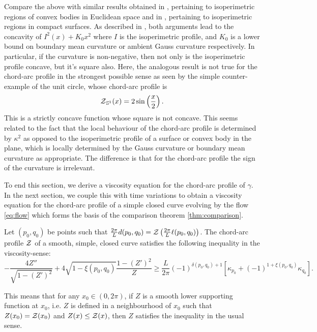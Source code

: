 \documentclass[a4paper, 12pt]{amsart}
\begin{document}
\begin{rem}
Compare the above with similar results obtained in \cite{MR1674097}, pertaining to isoperimetric regions of convex bodies in Euclidean space and in \cite{MR875084}, pertaining to isoperimetric regions in compact surfaces. As described in \cite{pbthesis}, both arguments lead to the concavity of $I^2(x) + K_0 x^2$ where $I$ is the isoperimetric profile, and $K_0$ is a lower bound on boundary mean curvature or ambient Gauss curvature respectively. In particular, if the curvature is non-negative, then not only is the isoperimetric profile concave, but it's square also. Here, the analogous result is not true for the chord-arc profile in the strongest possible sense as seen by the simple counter-example of the unit circle, whose chord-arc profile is 
\[
\operatorname{\mathcal{Z}}_{\mathbb{S}^1} (x) = 2 \sin \left(\frac{x}{2}\right).
\]
This is a strictly concave function whose square is not concave. This seems related to the fact that the local behaviour of the chord-arc profile is determined by $\kappa^2$ as opposed to the isoperimetric profile of a surface or convex body in the plane, which is locally determined by the Gauss curvature or boundary mean curvature as appropriate. The difference is that for the chord-arc profile the sign of the curvature is irrelevant.
\end{rem}

To end this section, we derive a viscosity equation for the chord-arc profile of $\gamma$. In the next section, we couple this with time variations to obtain a viscosity equation for the chord-arc profile of a simple closed curve evolving by the flow \ref{eq:flow} which forms the basis of the comparison theorem \ref{thm:comparison}. 

\begin{thm}
\label{thm:spatial_viscosity}
Let $(p_0,q_0)$ be points such that $\tfrac{2\pi}{L} d(p_0, q_0) = \operatorname{\mathcal{Z}}\left(\frac{2\pi}{L}\ell(p_0, q_0)\right)$. The chord-arc profile $\operatorname{\mathcal{Z}}$ of a smooth, simple, closed curve satisfies the following inequality in the viscosity-sense:
\[
-\frac{4Z''}{\sqrt{1 - (Z')^2}} + 4\sqrt{1-\xi(p_0,q_0)} \frac{1 - (Z')^2}{Z} \geq \frac{L}{2\pi} (-1)^{\delta(p_0,q_0)+1} \left[\kappa_{p_0} + (-1)^{1+\xi(p_0,q_0)} \kappa_{q_0}\right].
\]
\end{thm}

This means that for any $x_0 \in (0,2\pi)$, if $Z$ is a smooth lower supporting function at $x_0$, i.e. $Z$ is defined in a neighbourhood of $x_0$ such that $Z(x_0) = \operatorname{\mathcal{Z}} (x_0)$ and $Z(x) \leq \operatorname{\mathcal{Z}} (x)$, then $Z$ satisfies the inequality in the usual sense.
\end{document}
